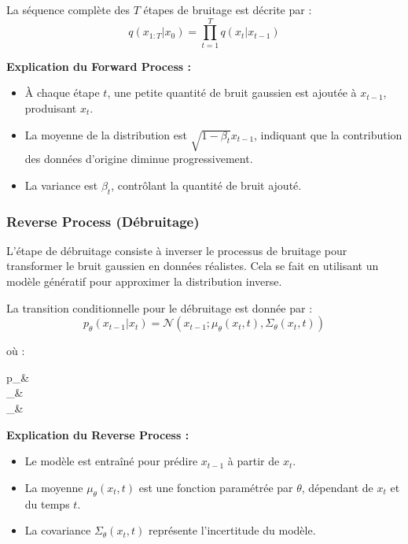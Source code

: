 La séquence complète des \( T \) étapes de bruitage est décrite par :
\[
	q(x_{1:T} | x_0) = \prod_{t=1}^T q(x_t | x_{t-1})
\]

\textbf{Explication du Forward Process :}

\begin{itemize}
	\item À chaque étape \( t \), une petite quantité de bruit gaussien est ajoutée à \( x_{t-1} \), produisant \( x_t \).
	\item La moyenne de la distribution est \( \sqrt{1 - \beta_t} x_{t-1} \), indiquant
	      que la contribution des données d'origine diminue progressivement.
	\item La variance est \( \beta_t \), contrôlant la quantité de bruit ajouté.
\end{itemize}

\subsubsection{Reverse Process (Débruitage)}

L'étape de débruitage consiste à inverser le processus de bruitage pour
transformer le bruit gaussien en données réalistes. Cela se fait en utilisant
un modèle génératif pour approximer la distribution inverse.

La transition conditionnelle pour le débruitage est donnée par :
\[
	p_\theta(x_{t-1} | x_t) = \mathcal{N}(x_{t-1}; \mu_\theta(x_t, t), \Sigma_\theta(x_t, t))
\]

où :
\begin{conditions}
	p_\theta &  \\
	\mu_\theta &  \\
	\Sigma_\theta & 
\end{conditions}

\textbf{Explication du Reverse Process :}

\begin{itemize}
	\item Le modèle est entraîné pour prédire \( x_{t-1} \) à partir de \( x_t \).
	\item La moyenne \( \mu_\theta(x_t, t) \) est une fonction paramétrée par \( \theta
	      \), dépendant de \( x_t \) et du temps \( t \).
	\item La covariance \( \Sigma_\theta(x_t, t) \) représente l'incertitude du modèle.
\end{itemize}

